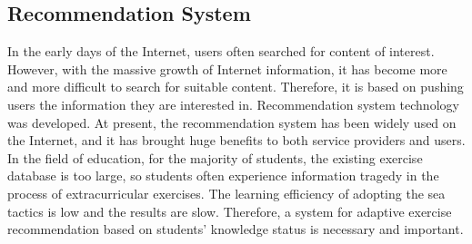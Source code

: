 \subsection{Recommendation System}


In the early days of the Internet, users often searched for content of interest. However, with the massive growth of Internet information, it has become more and more difficult to search for suitable content. Therefore, it is based on pushing users the information they are interested in. Recommendation system technology was developed. At present, the recommendation system has been widely used on the Internet, and it has brought huge benefits to both service providers and users. In the field of education, for the majority of students, the existing exercise database is too large, so students often experience information tragedy in the process of extracurricular exercises. The learning efficiency of adopting the sea tactics is low and the results are slow. Therefore, a system for adaptive exercise recommendation based on students' knowledge status is necessary and important\cite{tan2008learning}.

